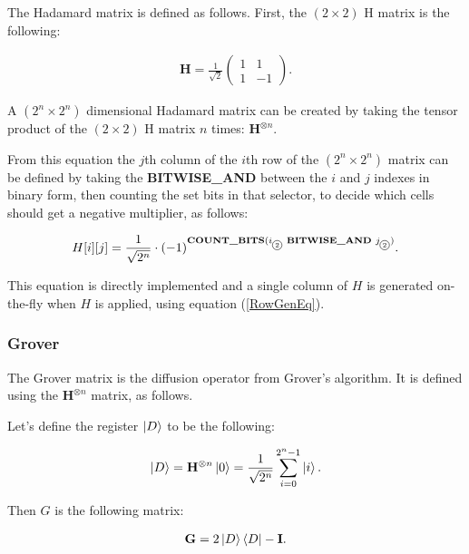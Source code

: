 The Hadamard matrix is defined as follows. First, the $(2\times{}2)$ H matrix is the following:

\begin{align*}
  \mathbf{H} = \frac{1}{\sqrt{2}}\begin{pmatrix}
      1 & 1  \\
      1 & -1
    \end{pmatrix}.
\end{align*}

A $(2^n\times{}2^n)$ dimensional Hadamard matrix can be created by taking the tensor product of the $(2\times{}2)$ H matrix $n$ times: $\mathbf{H}^{\otimes{}n}$.

From this equation the $j$th column of the $i$th row of the $(2^n\times{}2^n)$ matrix can be defined by taking the \textbf{BITWISE\_AND} between the $i$ and $j$ indexes in binary form, then counting the set bits in that selector, to decide which cells should get a negative multiplier, as follows:

\newcommand*\circled[1]{\tikz[baseline=(char.base)]{
            \node[shape=circle,draw,inner sep=1pt] (char) {#1};}}

\begin{align*}
H[i][j] = \frac{1}{\sqrt{2^n}}\cdot{}(-1)^{\text{\textbf{COUNT\_BITS}}(i_{\text{\circled{2}}} \text{\textbf{ BITWISE\_AND }} j_{\text{\circled{2}}})}.
\end{align*}

This equation is directly implemented and a single column of $H$ is generated on-the-fly when $H$ is applied, using equation (\ref{RowGenEq}).

\subsubsection{Grover}

The Grover matrix is the diffusion operator from Grover's algorithm. It is defined using the $\mathbf{H}^{\otimes{}n}$ matrix, as follows.

Let's define the register $\ket{D}$ to be the following:

\begin{align*}
\ket{D} = \mathbf{H}^{\otimes{}n}\ket{0} =
\frac{1}{\sqrt{2^n}} \sum\limits_{i=0}^{2^n-1} \ket{i}.
\end{align*}

Then $G$ is the following matrix:

\begin{align*}
    \mathbf{G} = 2\ket{D}\bra{D} - \mathbf{I}.
\end{align*}

